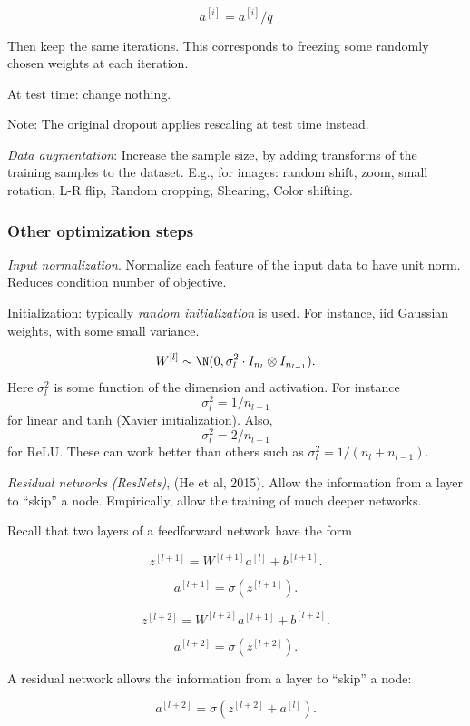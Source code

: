 \documentclass[english]{article}
\begin{document}
$$a^{[i]} = a^{[i]}/q$$


Then keep the same iterations. This corresponds to freezing some randomly chosen weights at each iteration.

At test time: change nothing. 

Note: The original dropout applies rescaling at test time instead. 

\item 
\emph{Data augmentation}: Increase the sample size, by adding transforms of the training samples to the dataset. E.g., for images: random shift, zoom, small rotation, L-R flip, Random cropping, Shearing, Color shifting. 
\eenum 

\subsubsection{Other optimization steps}


\benum
\item \emph{Input normalization}. Normalize each feature of the input data to have unit norm. Reduces condition number of objective. 

\item 
Initialization: typically \emph{random initialization} is used. For instance, iid Gaussian weights, with some small variance. 

$$W^{[l]} \sim \N(0, \sigma^2_l \cdot I_{n_l}\otimes I_{n_{l-1}}).$$
 Here $\sigma^2_l$ is some function of the dimension and activation. For instance $$\sigma^2_l = 1/n_{l-1}$$ for linear and tanh (Xavier initialization). Also, $$\sigma^2_l = 2/n_{l-1}$$ for ReLU. These can work better than others such as $\sigma^2_l = 1/(n_l+n_{l-1})$.

\item \emph{Residual networks (ResNets)}, (He et al, 2015). Allow the information from a layer to ``skip'' a node.  Empirically, allow the training of much deeper networks. 

Recall that two layers of a feedforward network have the form

$$z^{[l+1]} = W^{[l+1]}a^{[l]}+b^{[l+1]}.$$

$$a^{[l+1]} = \sigma(z^{[l+1]}).$$

$$z^{[l+2]} = W^{[l+2]}a^{[l+1]}+b^{[l+2]}.$$

$$a^{[l+2]} = \sigma(z^{[l+2]}).$$

A residual network allows the information from a layer to ``skip'' a node: 

$$a^{[l+2]} = \sigma(z^{[l+2]}+ a^{[l]}).$$
 
\end{document}
